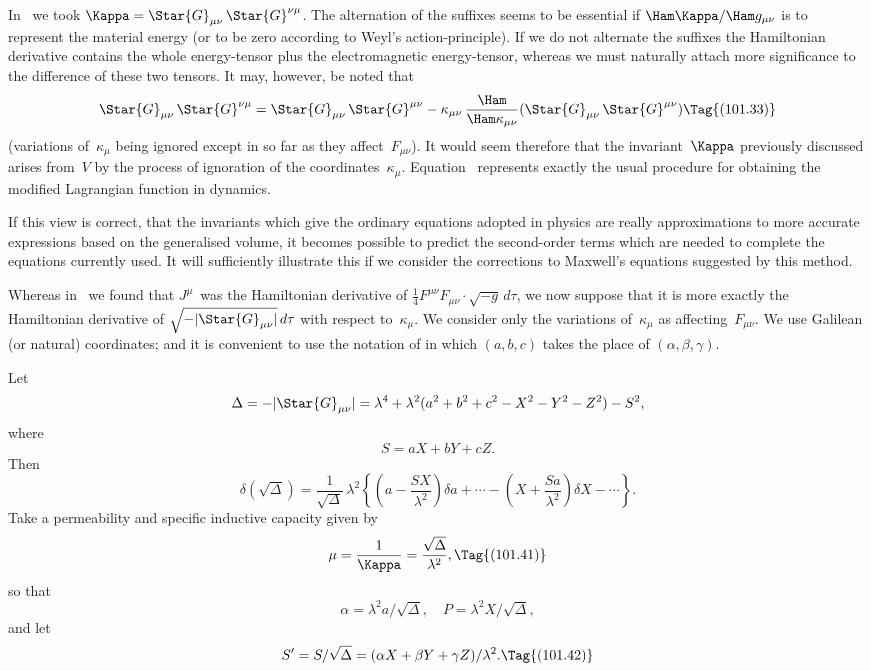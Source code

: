 \documentclass[12pt]{book}
\begin{document}
In~ we took $\Kappa = \Star{G}_{\mu\nu}\, \Star{G}^{\nu\mu}$. The alternation of the suffixes seems to
be essential if $\Ham\Kappa/\Ham g_{\mu\nu}$ is to represent the material energy (or to be zero
according to Weyl's action\hyp{}principle). If we do not alternate the suffixes the
Hamiltonian derivative contains the whole energy\hyp{}tensor plus the electromagnetic
energy\hyp{}tensor, whereas we must naturally attach more significance
to the difference of these two tensors. It may, however, be noted that
\[
\Star{G}_{\mu\nu}\, \Star{G}^{\nu\mu}
= \Star{G}_{\mu\nu}\, \Star{G}^{\mu\nu}
- \kappa_{\mu\nu}\, \frac{\Ham}{\Ham\kappa_{\mu\nu}}(\Star{G}_{\mu\nu}\, \Star{G}^{\mu\nu})
\Tag{(101.33)}
\]
(variations of~$\kappa_{\mu}$ being ignored except in so far as they affect~$F_{\mu\nu}$). It would
%
seem therefore that the invariant~$\Kappa$ previously discussed arises from~$V$ by the
process of ignoration of the coordinates~$\kappa_{\mu}$. Equation~ represents
exactly the usual procedure for obtaining the modified Lagrangian function in
%
dynamics.

If this view is correct, that the invariants which give the ordinary equations
adopted in physics are really approximations to more accurate expressions
based on the generalised volume, it becomes possible to predict the second\hyp{}order
terms which are needed to complete the equations currently used. It
will sufficiently illustrate this if we consider the corrections to Maxwell's
equations suggested by this method.

Whereas in~ we found that $J^{\mu}$~was the Hamiltonian derivative of
$\frac{1}{4} F^{\mu\nu} F_{\mu\nu} \cdot \sqrt{-g}\, d\tau$, we now suppose that it is more exactly the Hamiltonian
derivative of $\sqrt{-|\Star{G}_{\mu\nu}|}\, d\tau$ with respect to~$\kappa_{\mu}$\footnotemark.\footnotetext
  {We consider only the variations of~$\kappa_{\mu}$ as affecting~$F_{\mu\nu}$.}
We use Galilean (or natural)
coordinates; and it is convenient to use the notation of  in which $(a, b, c)$
takes the place of $(\alpha, \beta, \gamma)$.

Let
\[
\Delta = -|\Star{G}_{\mu\nu}|
= \lambda^4 + \lambda^2 (a^2 + b^2 + c^2 - X^2 - Y^2 - Z^2) - S^2,
\]
where
\[
S = aX + bY + cZ.
\]
Then
\[
\delta(\sqrt{\Delta})
= \frac{1}{\sqrt{\Delta}}\, \lambda^2 \left\{
\left(a - \frac{SX}{\lambda^2}\right) \delta a + \cdots
- \left(X + \frac{Sa}{\lambda^2}\right) \delta X - \cdots\right\}.
\]
Take a permeability and specific inductive capacity given by
%
\[
\mu = \frac{1}{\Kappa} = \frac{\sqrt{\Delta}}{\lambda^2},
\Tag{(101.41)}
\]
so that
\[
\alpha = \lambda^2a/\sqrt{\Delta},\quad
P = \lambda^2X/\sqrt{\Delta},
\]
and let
\[
S' = S/\sqrt{\Delta}
= (\alpha X + \beta Y + \gamma Z)/\lambda^2.
\Tag{(101.42)}
\]
\end{document}
